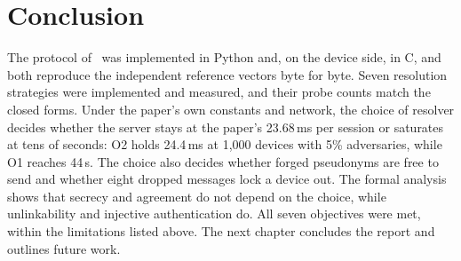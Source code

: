 \section{Conclusion}
The protocol of~\cite{base} was implemented in Python and, on the device side, in C, and both reproduce the independent reference vectors byte for byte. Seven resolution strategies were implemented and measured, and their probe counts match the closed forms. Under the paper's own constants and network, the choice of resolver decides whether the server stays at the paper's 23.68\,ms per session or saturates at tens of seconds: O2 holds 24.4\,ms at 1,000 devices with 5\% adversaries, while O1 reaches 44\,s. The choice also decides whether forged pseudonyms are free to send and whether eight dropped messages lock a device out. The formal analysis shows that secrecy and agreement do not depend on the choice, while unlinkability and injective authentication do. All seven objectives were met, within the limitations listed above. The next chapter concludes the report and outlines future work.
